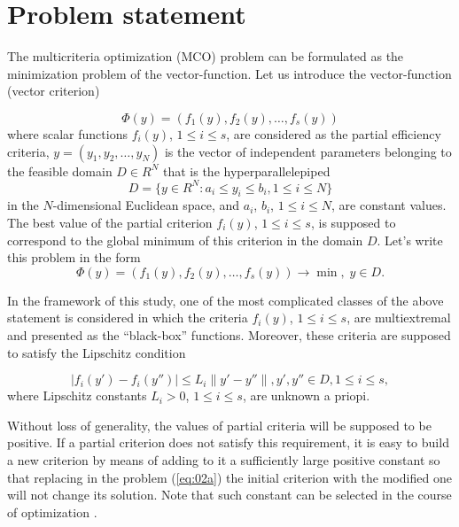 \documentclass[runningheads]{llncs}
\begin{document}
\section{Problem statement}
\label{sec:2}

The multicriteria optimization (MCO) problem can be formulated as the minimization problem of the vector-function. Let us introduce the vector-function (vector criterion)

\begin{equation}
\label{eq:01}
  \Phi(y) = (f_1 (y),f_2 (y), \dots, f_s(y))
\end{equation}
where scalar functions $f_i(y)$, $1 \leq i \leq s$, are considered as the partial efficiency criteria, $y=(y_1,y_2, \dots ,y_N)$ is the vector of independent parameters belonging to the feasible domain $D \in R^N$ that is the hyperparallelepiped
\begin{equation}
\label{eq:02}
    D=\{y \in R^N : a_i \leq y_i \leq b_i, 1 \leq i \leq N\}
\end{equation}
in the $N$-dimensional Euclidean space, and $a_i$, $b_i$, $1 \leq i \leq N$, are constant values.
The best value of the partial criterion $f_i(y)$, $1 \leq i \leq s$, is supposed to correspond to the global minimum of this criterion in the domain $D$.
Let's write this problem in the form
\begin{equation}
\label{eq:02a}
  \Phi(y) = (f_1 (y),f_2 (y), \dots, f_s(y)) \to \min, \; y \in D.
\end{equation}

In the framework of this study, one of the most complicated classes of the above statement is considered in which the criteria $f_i(y)$, $1 \leq i \leq s$, are multiextremal and presented as the ``black-box'' functions. Moreover, these criteria are supposed to satisfy the Lipschitz condition

\begin{equation}
\label{eq:03}
|f_i (y') - f_i (y'')| \leq L_i \|y' - y''\| ,y',y'' \in D, 1 \leq i \leq s,
\end{equation}
where Lipschitz constants $L_i>0$, $1 \leq i \leq s$, are unknown a priopi.  

Without loss of generality, the values of partial criteria will be supposed to be positive. If a partial criterion does not satisfy this requirement, it is easy to build a new criterion by means of adding to it a sufficiently large positive constant so that replacing in the problem (\ref{eq:02a}) the initial criterion with the modified one will not change its solution. Note that such constant can be selected in the course of optimization \cite{ML_MCO_2023}.
\end{document}
